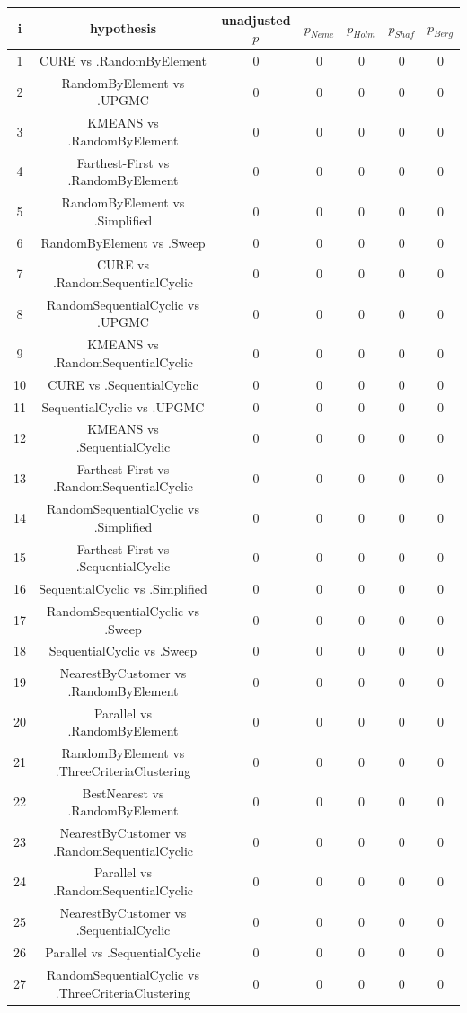 \documentclass[a4paper,10pt]{article}
\begin{document}
\begin{landscape}
\begin{table}[!htp]
\centering\scriptsize
\begin{tabular}{ccccccc}
i&hypothesis&unadjusted $p$&$p_{Neme}$&$p_{Holm}$&$p_{Shaf}$&$p_{Berg}$\\
\hline1&CURE vs .RandomByElement&0&0&0&0&0\\
2&RandomByElement vs .UPGMC&0&0&0&0&0\\
3&KMEANS vs .RandomByElement&0&0&0&0&0\\
4&Farthest-First vs .RandomByElement&0&0&0&0&0\\
5&RandomByElement vs .Simplified&0&0&0&0&0\\
6&RandomByElement vs .Sweep&0&0&0&0&0\\
7&CURE vs .RandomSequentialCyclic&0&0&0&0&0\\
8&RandomSequentialCyclic vs .UPGMC&0&0&0&0&0\\
9&KMEANS vs .RandomSequentialCyclic&0&0&0&0&0\\
10&CURE vs .SequentialCyclic&0&0&0&0&0\\
11&SequentialCyclic vs .UPGMC&0&0&0&0&0\\
12&KMEANS vs .SequentialCyclic&0&0&0&0&0\\
13&Farthest-First vs .RandomSequentialCyclic&0&0&0&0&0\\
14&RandomSequentialCyclic vs .Simplified&0&0&0&0&0\\
15&Farthest-First vs .SequentialCyclic&0&0&0&0&0\\
16&SequentialCyclic vs .Simplified&0&0&0&0&0\\
17&RandomSequentialCyclic vs .Sweep&0&0&0&0&0\\
18&SequentialCyclic vs .Sweep&0&0&0&0&0\\
19&NearestByCustomer vs .RandomByElement&0&0&0&0&0\\
20&Parallel vs .RandomByElement&0&0&0&0&0\\
21&RandomByElement vs .ThreeCriteriaClustering&0&0&0&0&0\\
22&BestNearest vs .RandomByElement&0&0&0&0&0\\
23&NearestByCustomer vs .RandomSequentialCyclic&0&0&0&0&0\\
24&Parallel vs .RandomSequentialCyclic&0&0&0&0&0\\
25&NearestByCustomer vs .SequentialCyclic&0&0&0&0&0\\
26&Parallel vs .SequentialCyclic&0&0&0&0&0\\
27&RandomSequentialCyclic vs .ThreeCriteriaClustering&0&0&0&0&0\\

\end{tabular}
\end{table}
\end{landscape}
\end{document}
